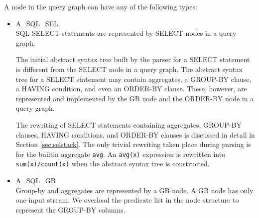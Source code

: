 A node in the query graph can have any of the following types:
\begin{itemize}
\item A\_SQL\_SEL\\
  SQL SELECT statements are represented by SELECT nodes in a query
  graph.
  
  The initial abstract syntax tree built by the parser for a SELECT
  statement is different from the SELECT node in a query graph. The
  abstract syntax tree for a SELECT statement may contain aggregates,
  a GROUP-BY clause, a HAVING condition, and even an ORDER-BY clause.
  These, however, are represented and implemented by the GB node and
  the ORDER-BY node in a query graph.
  
  The rewriting of SELECT statements containing aggregates, GROUP-BY
  clauses, HAVING conditions, and ORDER-BY clauses is discussed in
  detail in Section \ref{sec:selstack}. The only trivial rewriting
  taken place during parsing is for the builtin aggregate {\tt avg}.
  An {\tt avg(x)} expression is rewritten into {\tt sum(x)/count(x)}
  when the abstract syntax tree is constructed.
  
\item A\_SQL\_GB\\
  Group-by and aggregates are represented by a GB node. A GB node has
  only one input stream. We overload the predicate list in the node
  structure to represent the GROUP-BY columns.
  

\end{itemize}
